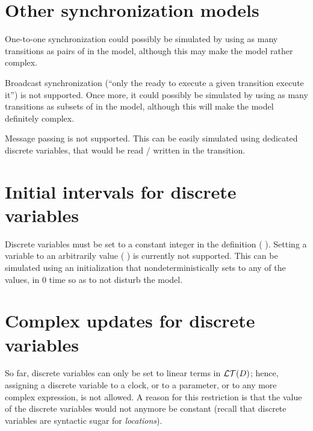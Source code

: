 \section{Other synchronization models}

One-to-one synchronization could possibly be simulated by using as many transitions as pairs of \IPTA{} in the model, although this may make the model rather complex.



Broadcast synchronization (``only the \IPTA{} ready to execute a given transition execute it'') is not supported.
Once more, it could possibly be simulated by using as many transitions as subsets of \IPTA{} in the model, although this will make the model definitely complex.



Message passing is not supported.
This can be easily simulated using dedicated discrete variables, that would be read / written in the transition.



\section{Initial intervals for discrete variables}

Discrete variables must be set to a constant integer in the  definition (\eg{} ).
Setting a variable to an arbitrarily value (\eg{} ) is currently not supported.
This can be simulated using an initialization \IPTA{} that nondeterministically sets  to any of the values, in 0 time so as to not disturb the model.


\section{Complex updates for discrete variables}

So far, discrete variables can only be set to linear terms in $\mathcal{LT}(D)$;
hence, assigning a discrete variable to a clock, or to a parameter, or to any more complex expression, is not allowed.
A reason for this restriction is that the value of the discrete variables would not anymore be constant (recall that discrete variables are syntactic sugar for \emph{locations}).


